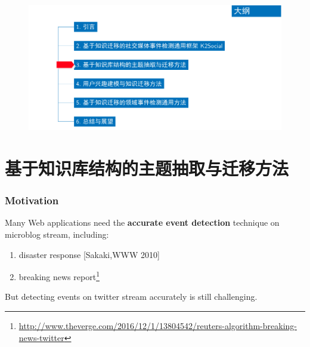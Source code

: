 \begin{frame}[plain]
\vspace*{-9.5mm}
\begin{figure}
	\hspace*{-4.2mm}
    \includegraphics[width=1.0\paperwidth]{img/contents3_output.pdf}
\end{figure}

\end{frame}

\section{基于知识库结构的主题抽取与迁移方法}
\begin{frame}
\frametitle{Motivation}

Many Web applications need the \textbf{accurate event detection} technique on microblog stream, including:
\begin{enumerate}
	\item disaster response [Sakaki,WWW 2010]
	\item breaking news report\footnote{\url{http://www.theverge.com/2016/12/1/13804542/reuters-algorithm-breaking-news-twitter}}
\end{enumerate}	
\vfill

But detecting events on twitter stream accurately is still challenging.
\end{frame}

